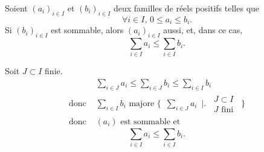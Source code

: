 \begin{prop}
	Soient $(a_i)_{i \in I}$ et $(b_i)_{i\in I}$ deux familles de réels positifs telles que  \[
		\forall i \in I,\,0 \le a_i \le b_i
	.\] Si $(b_i)_{i\in I}$ est sommable, alors $(a_i)_{i\in I}$ aussi, et, dans ce cas, \[
		\sum_{i \in I} a_i \le \sum_{i \in I} b_i
	.\]
\end{prop}

\begin{prv}
	Soit $J \subset I$ finie. 
	\begin{align*}
		&\sum_{i \in J} a_i \le \sum_{i \in J} b_i \le \sum_{i \in I} b_i\\
		\text{donc }& \sum_{i \in I} b_i \text{ majore } \Bigg\{\:\;\sum_{i \in J} a_i \:\;\Bigg|\Bigg.\:\;\substack{\displaystyle J \subset I\\[1mm]\displaystyle J \text{ fini}}\:\; \Bigg\}\\
		\text{donc }& (a_i) \text{ est sommable et}
	\end{align*}
	\[
		\sum_{i \in I} a_i \le \sum_{i \in I} b_i
	.\]
\end{prv}


